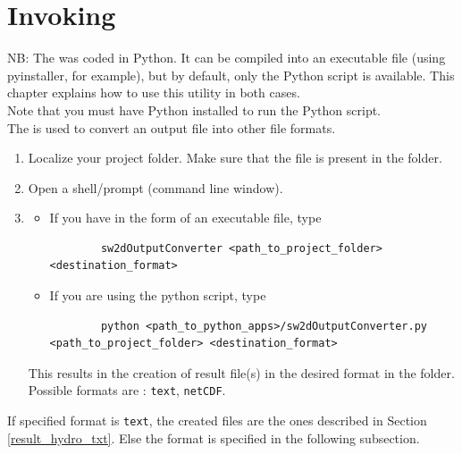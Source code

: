 \section{Invoking \swOutputConverter}

NB: The \swOutputConverter was coded in Python. It can be compiled into an executable file (using pyinstaller, for example), but by default, only the Python script is available. This chapter explains how to use this utility in both cases. \\
Note that you must have Python installed to run the Python script. \\

The \swOutputConverter is used to convert an output file  into other file formats.\\

\begin{enumerate}
	\item Localize your project folder. Make sure that the  file is present in the  folder.
	\item Open a shell/prompt (command line window).
	\item \begin{itemize}
		\item If you have \swOutputConverter in the form of an executable file, type
		\begin{small}\begin{verbatim}
		sw2dOutputConverter <path_to_project_folder> <destination_format>
		\end{verbatim}\end{small}
		\item If you are using the python script, type
		\begin{small}\begin{verbatim}
		python <path_to_python_apps>/sw2dOutputConverter.py <path_to_project_folder> <destination_format>
		\end{verbatim}\end{small}
	\end{itemize}
	This results in the creation of result file(s) in the desired format in the  folder. Possible formats are : \texttt{text}, \texttt{netCDF}.
\end{enumerate}

If specified format is \texttt{text}, the created files are the ones described in Section \ref{result_hydro_txt}. Else the format is specified in the following subsection.
